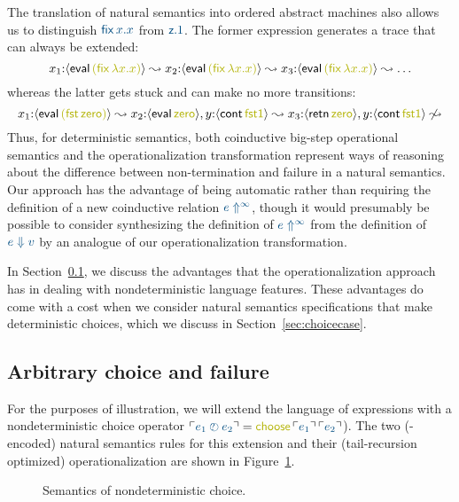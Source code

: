 The translation of natural semantics into ordered abstract machines
also allows us to distinguish $\obj{{\sf fix}\,x.x}$ from $\obj{{\sf z}.1}$.
The former expression generates a trace that can always be extended:
\[ x_1{:}\susp{{\sf eval}\,\lf{({\sf fix}\,\lambda x.x)}} \leadsto
   x_2{:}\susp{{\sf eval}\,\lf{({\sf fix}\,\lambda x.x)}} \leadsto
   x_3{:}\susp{{\sf eval}\,\lf{({\sf fix}\,\lambda x.x)}} \leadsto \ldots 
\]whereas the latter gets stuck and can make no more transitions:\[ 
  x_1{:}\susp{{\sf eval}\,\lf{({\sf fst}\,{\sf zero})}} \leadsto
  x_2{:}\susp{{\sf eval}\,\lf{\sf zero}}, y{:}\susp{{\sf cont}\,\lf{\sf fst1}} \leadsto
  x_3{:}\susp{{\sf retn}\,\lf{\sf zero}}, y{:}\susp{{\sf cont}\,\lf{\sf fst1}} 
  \not\leadsto
\]
Thus, for deterministic semantics, both coinductive big-step
operational semantics and the operationalization transformation
represent ways of reasoning about the difference between
non-termination and failure in a natural semantics. Our approach has
the advantage of being automatic rather than requiring the definition
of a new coinductive relation $\obj{e \Uparrow^\infty}$, though it would
presumably be possible to consider synthesizing the definition of $\obj{e
\Uparrow^\infty}$ from the definition of $\obj{e \Downarrow v}$ by an
analogue of our operationalization transformation.

In Section~\ref{sec:choicefail}, we discuss the advantages that the
operationalization approach has in dealing with nondeterministic
language features. These advantages do come with a cost when 
we consider natural semantics specifications that make deterministic
choices, which we discuss in Section~\ref{sec:choicecase}.

\subsection{Arbitrary choice and failure}
\label{sec:choicefail}

For the purposes of illustration, we will extend the language of
expressions with a nondeterministic choice operator $\interp{e_1 \arb
  e_2} = \lf{{\sf choose}\,\interp{e_1}\,\interp{e_2}}$).  The two
(\sls-encoded) natural semantics rules for this extension and their
(tail-recursion optimized) operationalization are shown in
Figure~\ref{fig:ns-arb}.

\begin{figure}[t]
\begin{minipage}[b]{0.45\linewidth}
\end{minipage}
\hspace{0.5cm}
\begin{minipage}[b]{0.55\linewidth}
\end{minipage}
\caption{Semantics of nondeterministic choice.}
\label{fig:ns-arb}
\end{figure}

